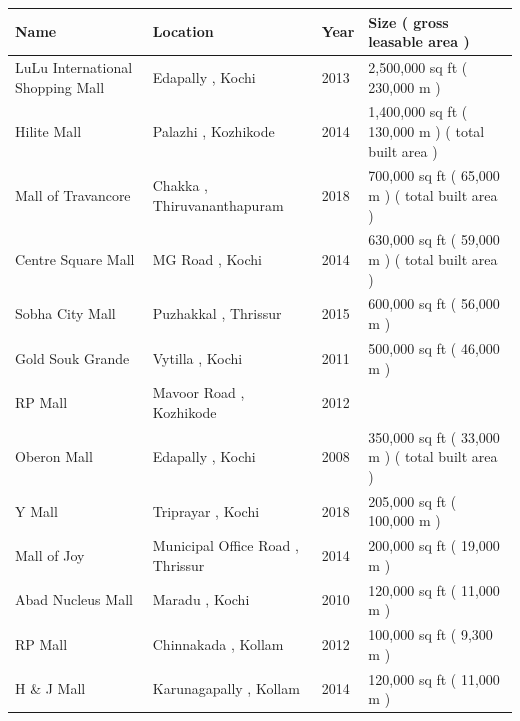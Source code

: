 \documentclass{article}
\begin{document}
\begin{tabular}{llll}
\toprule
Name & Location & Year & Size ( gross leasable area ) \\
\midrule
LuLu International Shopping Mall & Edapally , Kochi & 2013 & 2,500,000 sq ft ( 230,000 m ) \\
Hilite Mall & Palazhi , Kozhikode & 2014 & 1,400,000 sq ft ( 130,000 m ) ( total built area ) \\
Mall of Travancore & Chakka , Thiruvananthapuram & 2018 & 700,000 sq ft ( 65,000 m ) ( total built area ) \\
Centre Square Mall & MG Road , Kochi & 2014 & 630,000 sq ft ( 59,000 m ) ( total built area ) \\
Sobha City Mall & Puzhakkal , Thrissur & 2015 & 600,000 sq ft ( 56,000 m ) \\
Gold Souk Grande & Vytilla , Kochi & 2011 & 500,000 sq ft ( 46,000 m ) \\
RP Mall & Mavoor Road , Kozhikode & 2012 &  \\
Oberon Mall & Edapally , Kochi & 2008 & 350,000 sq ft ( 33,000 m ) ( total built area ) \\
Y Mall & Triprayar , Kochi & 2018 & 205,000 sq ft ( 100,000 m ) \\
Mall of Joy & Municipal Office Road , Thrissur & 2014 & 200,000 sq ft ( 19,000 m ) \\
Abad Nucleus Mall & Maradu , Kochi & 2010 & 120,000 sq ft ( 11,000 m ) \\
RP Mall & Chinnakada , Kollam & 2012 & 100,000 sq ft ( 9,300 m ) \\
H \& J Mall & Karunagapally , Kollam & 2014 & 120,000 sq ft ( 11,000 m ) \\
\bottomrule
\end{tabular}
\end{document}
